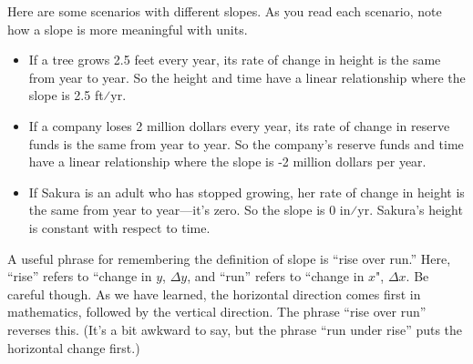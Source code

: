 \documentclass{ximera}
\begin{document}
Here are some scenarios with different slopes. As you read each scenario, note how a slope is more meaningful with units.
\begin{itemize} 
\item If a tree grows 2.5 feet every year, its rate of change in height is the same from year to year. So the height and time have a linear relationship where the slope is 2.5 ft⁄yr.
\item If a company loses 2 million dollars every year, its rate of change in reserve funds is the same from year to year. So the company's reserve funds and time have a linear relationship where the slope is -2  million dollars per year.
\item If Sakura is an adult who has stopped growing, her rate of change in height is the same from year to year—it's zero. So the slope is 0 in⁄yr. Sakura's height is constant with respect to time.
\end{itemize}

\begin{tcolorbox}[colback=blue!5]
\begin{remark}
A useful phrase for remembering the definition of slope is “rise over run.” Here, “rise” refers to “change in $y$, $\Delta y$, and “run” refers to “change in $x$", $\Delta x$. Be careful though. As we have learned, the horizontal direction comes first in mathematics, followed by the vertical direction. The phrase “rise over run” reverses this. (It's a bit awkward to say, but the phrase “run under rise” puts the horizontal change first.)
\end{remark}
\end{tcolorbox}
\end{document}
